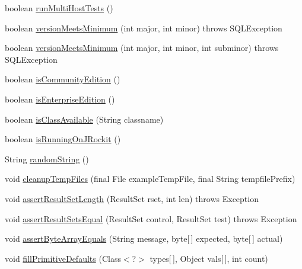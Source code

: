\begin{DoxyCompactItemize}
\item 
boolean \mbox{\hyperlink{classtestsuite_1_1_base_test_case_a145dcd536d811f0f904c1d711cf275f7}{run\+Multi\+Host\+Tests}} ()
\item 
boolean \mbox{\hyperlink{classtestsuite_1_1_base_test_case_a4098e9a480c1907875ded976cdbc81a3}{version\+Meets\+Minimum}} (int major, int minor)  throws S\+Q\+L\+Exception 
\item 
boolean \mbox{\hyperlink{classtestsuite_1_1_base_test_case_a13e93e8347469a0c2e8dbf3be8795bb5}{version\+Meets\+Minimum}} (int major, int minor, int subminor)  throws S\+Q\+L\+Exception 
\item 
boolean \mbox{\hyperlink{classtestsuite_1_1_base_test_case_a30a8a94757291826321a07c5b10a6233}{is\+Community\+Edition}} ()
\item 
boolean \mbox{\hyperlink{classtestsuite_1_1_base_test_case_ae29a3a848b87638921a7078f572b3f83}{is\+Enterprise\+Edition}} ()
\item 
boolean \mbox{\hyperlink{classtestsuite_1_1_base_test_case_af67350d0499d7649ea352fddd70b0be2}{is\+Class\+Available}} (String classname)
\item 
boolean \mbox{\hyperlink{classtestsuite_1_1_base_test_case_aa78a5395ed790afc608520b5dc239552}{is\+Running\+On\+J\+Rockit}} ()
\item 
String \mbox{\hyperlink{classtestsuite_1_1_base_test_case_ad7304f085aa6f697299a0a10fb1f0e4d}{random\+String}} ()
\item 
void \mbox{\hyperlink{classtestsuite_1_1_base_test_case_a604f630b7961dd73826ab5416a076ec7}{cleanup\+Temp\+Files}} (final File example\+Temp\+File, final String tempfile\+Prefix)
\item 
void \mbox{\hyperlink{classtestsuite_1_1_base_test_case_aa23dd720e89199dbafdc084069ed2ef3}{assert\+Result\+Set\+Length}} (Result\+Set rset, int len)  throws Exception 
\item 
void \mbox{\hyperlink{classtestsuite_1_1_base_test_case_a9610d1a24e717741f2ec5cd310361d45}{assert\+Result\+Sets\+Equal}} (Result\+Set control, Result\+Set test)  throws Exception 
\item 
void \mbox{\hyperlink{classtestsuite_1_1_base_test_case_a64c93499839212c311d50823ef3f4edc}{assert\+Byte\+Array\+Equals}} (String message, byte\mbox{[}$\,$\mbox{]} expected, byte\mbox{[}$\,$\mbox{]} actual)
\item 
void \mbox{\hyperlink{classtestsuite_1_1_base_test_case_a0a24b304ec6c8bcc8ffa37528d1c0800}{fill\+Primitive\+Defaults}} (Class$<$?$>$ types\mbox{[}$\,$\mbox{]}, Object vals\mbox{[}$\,$\mbox{]}, int count)

\end{DoxyCompactItemize}

